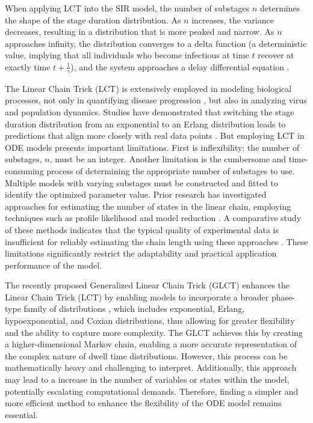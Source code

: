 \documentclass[12pt]{article}
\begin{document}
When applying LCT into the SIR model, the number of substages $n$ determines the shape of the stage duration distribution. As $n$ increases, the variance decreases, resulting in a distribution that is more peaked and narrow. As $n$ approaches infinity, the distribution converges to a delta function (a deterministic value, implying that all individuals who become infectious at time $t$ recover at exactly time $t + \frac{1}{\gamma}$), and the system approaches a delay differential equation \cite{krylova2013effects}\cite{hethcote1980integral}.

The Linear Chain Trick (LCT) is extensively employed in modeling biological processes, not only in quantifying disease progression \cite{lloyd2001destabilization}\cite{lloyd2001realistic}, but also in analyzing virus \cite{lloyd2001dependence}\cite{kakizoe2015method} and population \cite{cushing2013integrodifferential} dynamics. Studies have demonstrated that switching the stage duration distribution from an exponential to an Erlang distribution leads to predictions that align more closely with real data points \cite{kakizoe2015method}. But employing LCT in ODE models presents important limitations. First is inflexibility: the number of substages, $n$, must be an integer. Another limitation is the cumbersome and time-consuming process of determining the appropriate number of substages to use. Multiple models with varying substages must be constructed and fitted to identify the optimized parameter value. Prior research has investigated approaches for estimating the number of states in the linear chain, employing techniques such as profile likelihood \cite{raue2009structural} and model reduction \cite{maiwald2016driving}. A comparative study of these methods indicates that the typical quality of experimental data is insufficient for reliably estimating the chain length using these approaches \cite{hauber2020estimating}. These limitations significantly restrict the adaptability and practical application performance of the model.

The recently proposed Generalized Linear Chain Trick (GLCT) enhances the Linear Chain Trick (LCT) by enabling models to incorporate a broader phase-type family of distributions \cite{hurtado2019generalizations}\cite{hurtado2021building}\cite{bladt2017phase}, which includes exponential, Erlang, hypoexponential, and Coxian distributions, thus allowing for greater flexibility and the ability to capture more complexity. The GLCT achieves this by creating a higher-dimensional Markov chain, enabling a more accurate representation of the complex nature of dwell time distributions. However, this process can be mathematically heavy and challenging to interpret. Additionally, this approach may lead to a increase in the number of variables or states within the model, potentially escalating computational demands. Therefore, finding a simpler and more efficient method to enhance the flexibility of the ODE model remains essential.
\end{document}
